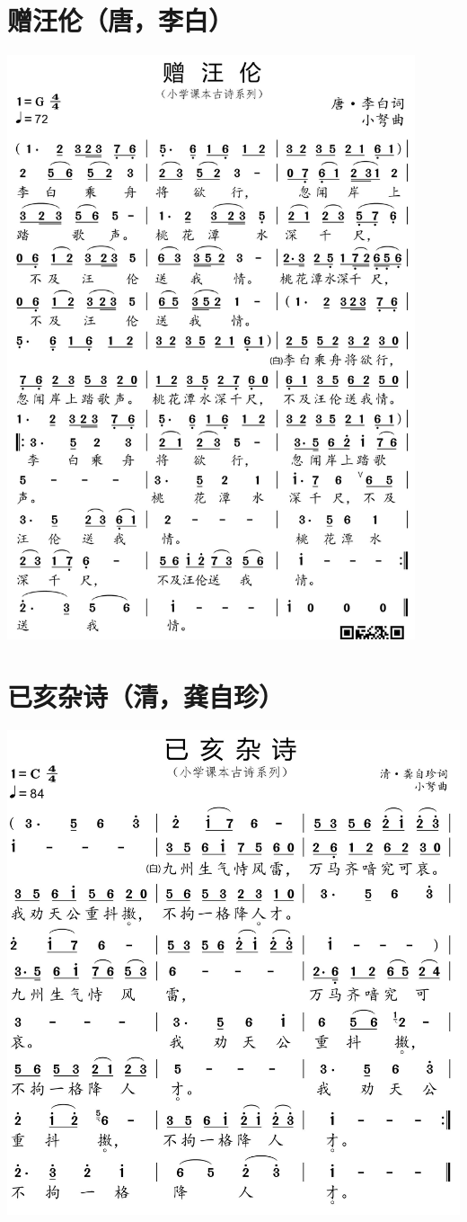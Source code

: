 \documentclass[cn,pad,twocol]{elegantbook}
\begin{document}
\section{赠汪伦（唐，李白）}    \includegraphics[width=0.9\textwidth]{dongxiao/20200627-古诗-赠汪伦.jpg}   
\section{已亥杂诗（清，龚自珍）}\includegraphics[width=\textwidth]{dongxiao/20200627-古诗-龚自珍-已亥杂诗.jpg}   
\end{document}
